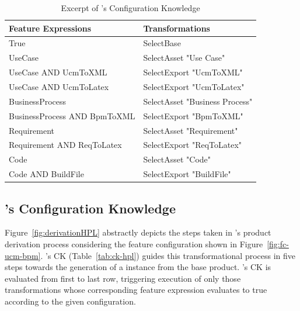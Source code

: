 \begin{table}[h]
\begin{center}
\begin{tabular}{||l||l||}
  \hline
  \textbf{Feature Expressions} & \textbf{Transformations}   \\  \hline
  True & SelectBase \\  \hline
  UseCase & SelectAsset "Use Case" \\ \hline
  UseCase AND UcmToXML & SelectExport "UcmToXML"  \\ \hline
  UseCase AND UcmToLatex & SelectExport "UcmToLatex" \\ \hline
  BusinessProcess & SelectAsset "Business Process" \\ \hline
  BusinessProcess AND BpmToXML & SelectExport "BpmToXML" \\ \hline
  Requirement & SelectAsset "Requirement" \\ \hline
  Requirement AND ReqToLatex & SelectExport "ReqToLatex" \\ \hline
  Code & SelectAsset "Code" \\ \hline
  Code AND BuildFile & SelectExport "BuildFile" \\ \hline
\end{tabular}
\caption{Excerpt of \hpl's Configuration Knowledge}
\label{tab:hpl-ck}
\end{center}
\end{table}


\subsection{\hpl's Configuration Knowledge} 
\label{sec:hpl-ck}


Figure~\ref{fig:derivationHPL} abstractly depicts the steps taken in \hpl's product derivation process considering the feature configuration shown in  Figure~\ref{fig:fc-ucm-bpm}. \hpl{}'s CK (Table~\ref{tab:ck-hpl}) guides this transformational process in five steps towards the generation of a \hpl{} instance from the base product. \hpl{}'s CK is evaluated from first to last row, triggering execution of only those transformations whose corresponding feature expression evaluates to true according to the given configuration.

